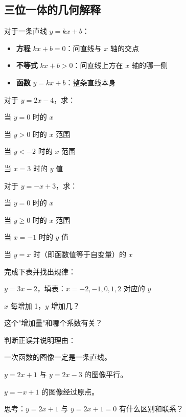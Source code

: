 \subsection*{三位一体的几何解释}

对于一条直线 $y=kx+b$：

\begin{itemize}
  \item \textbf{方程} $kx+b=0$：问直线与 $x$ 轴的交点
  \item \textbf{不等式} $kx+b>0$：问直线上方在 $x$ 轴的哪一侧
  \item \textbf{函数} $y=kx+b$：整条直线本身
\end{itemize}


\begin{exercise}
\item 对于 $y=2x-4$，求：
  \begin{subexercise}
    \item 当 $y=0$ 时的 $x$
    \item 当 $y>0$ 时的 $x$ 范围
    \item 当 $y<-2$ 时的 $x$ 范围
    \item 当 $x=3$ 时的 $y$ 值
  \end{subexercise}

\item 对于 $y=-x+3$，求：
  \begin{subexercise}
    \item 当 $y=0$ 时的 $x$
    \item 当 $y\ge0$ 时的 $x$ 范围
    \item 当 $x=-1$ 时的 $y$ 值
    \item 当 $y=x$ 时（即函数值等于自变量）的 $x$
  \end{subexercise}

\item 完成下表并找出规律：
  \begin{subexercise}
    \item $y=3x-2$，填表：$x=-2,-1,0,1,2$ 对应的 $y$
    \item $x$ 每增加 1，$y$ 增加几？
    \item 这个"增加量"和哪个系数有关？
  \end{subexercise}

\item 判断正误并说明理由：
  \begin{subexercise}
    \item 一次函数的图像一定是一条直线。
    \item $y=2x+1$ 与 $y=2x-3$ 的图像平行。
    \item $y=-x+1$ 的图像经过原点。
  \end{subexercise}

\item 思考：$y=2x+1$ 与 $y=2x+1=0$ 有什么区别和联系？
\end{exercise}


